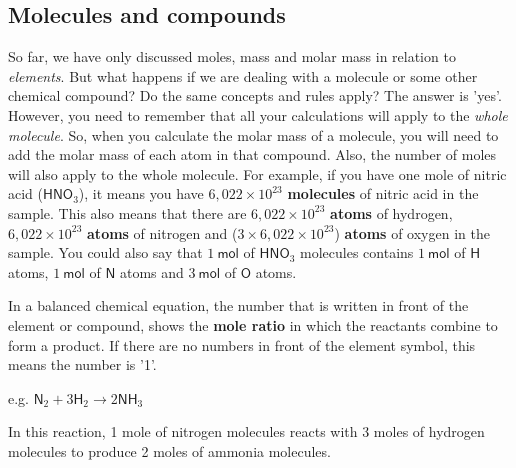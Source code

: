             \subsection*{Molecules and compounds}
            \nopagebreak
      \label{m38717*id278284}So far, we have only discussed moles, mass and molar mass in relation to \textsl{elements}. But what happens if we are dealing with a molecule or some other chemical compound? Do the same concepts and rules apply? The answer is 'yes'. However, you need to remember that all your calculations will apply to the \textsl{whole molecule}. So, when you calculate the molar mass of a molecule, you will need to add the molar mass of each atom in that compound. Also, the number of moles will also apply to the whole molecule. For example, if you have one mole of nitric acid ($\mathsf{HNO}{}_{3}$), it means you have $6,022\ensuremath{\times}{10}^{23}$ \textbf{molecules} of nitric acid in the sample. This also means that there are $6,022\ensuremath{\times}{10}^{23}$ \textbf{atoms} of hydrogen, $6,022\ensuremath{\times}{10}^{23}$ \textbf{atoms} of nitrogen and ($3\ensuremath{\times}6,022\ensuremath{\times}{10}^{23}$) \textbf{atoms} of oxygen in the sample. You could also say that $1~ \mathsf{mol}$ of $\mathsf{HNO}_{3}$ molecules contains $1 ~\mathsf{mol}$ of $\mathsf{H}$ atoms, $1 ~\mathsf{mol}$ of $\mathsf{N}$ atoms and $3 ~\mathsf{mol}$ of $\mathsf{O}$ atoms. \par 
      \label{m38717*id278429}In a balanced chemical equation, the number that is written in front of the element or compound, shows the \textbf{mole ratio} in which the reactants combine to form a product. If there are no numbers in front of the element symbol, this means the number is '1'.\par 
      \label{m38717*id278442}e.g. ${\mathsf{N}}_{2}+3{\mathsf{H}}_{2}\to 2\mathsf{N}{\mathsf{H}}_{3}$\par 
      \label{m38717*id278488}In this reaction, 1 mole of nitrogen molecules reacts with 3 moles of hydrogen molecules to produce 2 moles of ammonia molecules.\par 
\label{m38717*secfhsst!!!underscore!!!id566}\vspace{.5cm} 
